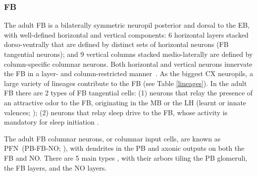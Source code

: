         \subsubsection{FB}
        The adult FB is a bilaterally symmetric neuropil posterior and dorsal to the EB, with well-defined horizontal and vertical components: 6 horizontal layers stacked dorso-ventrally that are defined by distinct sets of horizontal neurons (FB tangential neurons); and 9 vertical columns stacked medio-laterally are defined by column-specific columnar neurons.
        Both horizontal and vertical neurons innervate the FB in a layer- and column-restricted manner~\citep{heinze2017unraveling}.
        As the biggest CX neuropils, a large variety of lineages contribute to the FB (see Table \ref{lineages}).
        In the adult FB there are 2 types of FB tangential cells: (1) neurons that relay the presence of an attractive odor to the FB, originating in the MB or the LH (learnt or innate valences; \citep{hulse2021connectome}); (2) neurons that relay sleep drive to the FB, whose activity is mandatory for sleep initiation \citep{ShaferKeene2021sleep}. %
        

        The adult FB columnar neurons, or columnar input cells, are known as PFN~(PB-FB-NO; \citep{wolff2015neuroarchitecture}), with dendrites in the PB and axonic outputs on both the FB and NO.
        There are 5 main types \citep{hulse2021connectome}, with their arbors tiling the PB glomeruli, the FB layers, and the NO layers.

